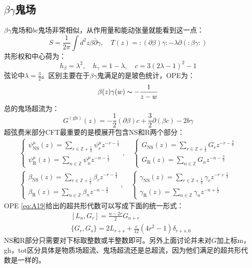 \subsection{$\beta\gamma$鬼场}
$\beta\gamma$鬼场和$bc$鬼场非常相似，从作用量和能动张量就能看到这一点：
\begin{equation}
	S=\frac{1}{2\pi}\int d^2z\beta\bar{\partial}\gamma,\quad T(z)=:(\partial\beta)\gamma:-\lambda\partial(:\beta\gamma:)
\end{equation}
共形权和中心荷为：
\begin{equation}
	h_\beta=\lambda^2,\quad h_\gamma=1-\lambda,\quad c=3(2\lambda-1)^2-1
\end{equation}
弦论中$\lambda = \frac32$。区别主要在于$\beta\gamma$鬼满足的是玻色统计，OPE为：
\begin{equation}
	\beta(z)\gamma(w)\thicksim-\frac{1}{z-w}
\end{equation}
总的鬼场超流为：
\begin{equation}
	G^{(\mathrm{gh})}(z)=-\frac{1}{2}(\partial\beta)c+\frac{3}{2}\partial(\beta c)-2b\gamma
\end{equation}
超弦费米部分CFT最重要的是模展开包含NS和R两个部分：
\begin{equation}
\begin{gathered}
		\begin{cases}
		\psi_\mathrm{NS}^\mu(z)=\sum_{r\in\mathbb{Z}+\frac{1}{2}}\psi_r^\mu z^{-r-\frac{1}{2}}\\\psi_\mathrm{R}^\mu(z)=\sum_{n\in\mathbb{Z}}\psi_n^\mu z^{-n-\frac{1}{2}}
		\end{cases}
		,\quad 
		\begin{cases}G_{\mathrm{NS}}(z)=\sum_{r\in\mathbb{Z}+\frac{1}{2}}G_rz^{-r-\frac{3}{2}}\\G_{\mathrm{R}}(z)=\sum_{n\in\mathbb{Z}}G_nz^{-n-\frac{3}{2}}\end{cases}
		\\
	\begin{cases}\beta_{\mathrm{NS}}(z)=\sum_{r\in\mathbb{Z}+\frac{1}{2}}\beta_rz^{-r-\frac{3}{2}}\\\beta_{\mathrm{R}}(z)=\sum_{n\in\mathbb{Z}}\beta_nz^{-n-\frac{3}{2}}\end{cases},\quad
				\begin{cases}\gamma_{\mathrm{NS}}(z)=\sum_{r\in\mathbb{Z}+\frac{1}{2}}\gamma_rz^{-r+\frac{1}{2}}\\\gamma_{\mathrm{R}}(z)=\sum_{n\in\mathbb{Z}}\gamma_nz^{-n+\frac{1}{2}}\end{cases}
\end{gathered}
\end{equation}
OPE \ref{eq:A19}给出的超共形代数可以写成下面的统一形式：
\begin{equation}
	\begin{aligned}&[L_n,G_r]=\frac{n-2r}{2}G_{n+r}\\&\{G_r,G_s\}=2L_{r+s}+\frac{c}{12}(4r^2-1)\delta_{r+s,0}\end{aligned}
\end{equation}
NS和R部分只需要对下标取整数或半整数即可。另外上面讨论并未对$G$加上标m，gh，tot区分具体是物质场超流、鬼场超流还是总超流，因为他们满足的超共形代数是一样的。

